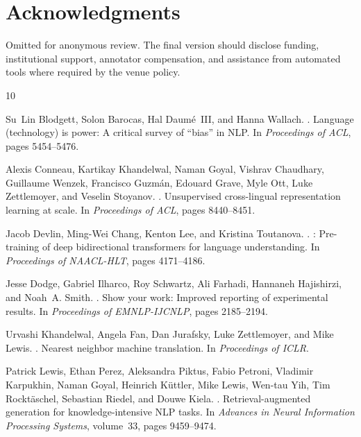 \section*{Acknowledgments}

Omitted for anonymous review. The final version should disclose funding,
institutional support, annotator compensation, and assistance from automated
tools where required by the venue policy.


\begin{thebibliography}{10}
\setlength{\bibsep}{2pt}
\small

Su~Lin Blodgett, Solon Barocas, Hal Daum\'e~III, and Hanna Wallach.
.
\newblock Language (technology) is power: A critical survey of ``bias'' in
NLP.
\newblock In \emph{Proceedings of ACL}, pages 5454--5476.

Alexis Conneau, Kartikay Khandelwal, Naman Goyal, Vishrav Chaudhary, Guillaume
Wenzek, Francisco Guzm\'an, Edouard Grave, Myle Ott, Luke Zettlemoyer, and
Veselin Stoyanov.
.
\newblock Unsupervised cross-lingual representation learning at scale.
\newblock In \emph{Proceedings of ACL}, pages 8440--8451.

Jacob Devlin, Ming-Wei Chang, Kenton Lee, and Kristina Toutanova.
.
: Pre-training of deep bidirectional transformers for language
understanding.
\newblock In \emph{Proceedings of NAACL-HLT}, pages 4171--4186.

Jesse Dodge, Gabriel Ilharco, Roy Schwartz, Ali Farhadi, Hannaneh Hajishirzi,
and Noah~A. Smith.
.
\newblock Show your work: Improved reporting of experimental results.
\newblock In \emph{Proceedings of EMNLP-IJCNLP}, pages 2185--2194.

Urvashi Khandelwal, Angela Fan, Dan Jurafsky, Luke Zettlemoyer, and Mike Lewis.
.
\newblock Nearest neighbor machine translation.
\newblock In \emph{Proceedings of ICLR}.

Patrick Lewis, Ethan Perez, Aleksandra Piktus, Fabio Petroni, Vladimir
Karpukhin, Naman Goyal, Heinrich K\"uttler, Mike Lewis, Wen-tau Yih, Tim
Rockt\"aschel, Sebastian Riedel, and Douwe Kiela.
.
\newblock Retrieval-augmented generation for knowledge-intensive {NLP} tasks.
\newblock In \emph{Advances in Neural Information Processing Systems},
volume~33, pages 9459--9474.


\end{thebibliography}

